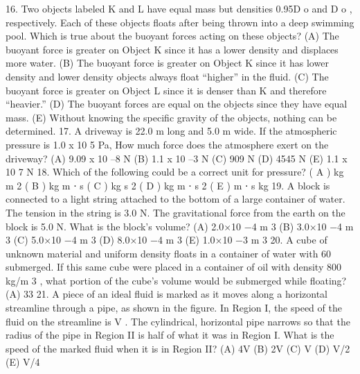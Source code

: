 16. Two objects labeled K and L have equal mass but densities 0.95D o and D o , respectively. Each of these objects
floats after being thrown into a deep swimming pool. Which is true about the buoyant forces acting on these
objects?
(A) The buoyant force is greater on Object K since it has a lower density and displaces more water.
(B) The buoyant force is greater on Object K since it has lower density and lower density objects always float
“higher” in the fluid.
(C) The buoyant force is greater on Object L since it is denser than K and therefore “heavier.”
(D) The buoyant forces are equal on the objects since they have equal mass.
(E) Without knowing the specific gravity of the objects, nothing can be determined.
17. A driveway is 22.0 m long and 5.0 m wide. If the atmospheric pressure is 1.0 x 10 5 Pa, How much force does
the atmosphere exert on the driveway?
(A) 9.09 x 10 –8 N
(B) 1.1 x 10 –3 N
(C) 909 N
(D) 4545 N
(E) 1.1 x 10 7 N
18. Which of the following could be a correct unit for pressure?
( A )
kg
m 2
( B )
kg
m ⋅ s
( C )
kg
s 2
( D )
kg
m ⋅ s 2
( E )
m ⋅ s
kg
19. A block is connected to a light string attached to the bottom of a large
container of water. The tension in the string is 3.0 N. The gravitational
force from the earth on the block is 5.0 N. What is the block’s volume?
(A) 2.0×10 −4 m 3
(B) 3.0×10 −4 m 3
(C) 5.0×10 −4 m 3
(D) 8.0×10 −4 m 3
(E) 1.0×10 −3 m 3
20. A cube of unknown material and uniform density floats in a container of water with 60%
submerged. If this same cube were placed in a container of oil with density 800 kg/m 3 , what portion of the
cube’s volume would be submerged while floating?
(A) 33%
21. A piece of an ideal fluid is marked as it moves
along a horizontal streamline through a pipe, as
shown in the figure. In Region I, the speed of the
fluid on the streamline is V . The cylindrical,
horizontal pipe narrows so that the radius of the
pipe in Region II is half of what it was in Region
I. What is the speed of the marked fluid when it
is in Region II?
(A) 4V
(B) 2V
(C) V
(D) V/2
(E) V/4



